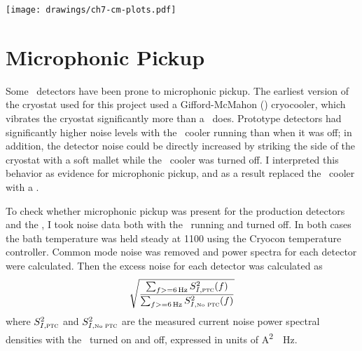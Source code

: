 \begin{figure*}
\texttt{[image: drawings/ch7-cm-plots.pdf]}
\caption[Plots summarizing common mode signal and $1/f$ noise]{
Plots summarizing common mode signal and $1/f$ noise.
\textbf{Upper Left}
Plot showing raw detector output for 15 detectors over a 10-minute data acquisition.
The data was acquired at \SI{15625}{\Hz}, but only every 100th data point is plotted.
\textbf{Upper Right} 
The same data after removal of the common mode signal (as defined in the text).
\textbf{Lower Left} 
Current noise power spectral density for the raw data, the raw data minus the common mode (``No CM''), the raw data minus the common mode and the best-fit 4th-order polynomial (``No CM, Poly''), and the common mode itself (``CM'').
The strong noise peak at \SI{1.411}{\Hz} is due to the \PTC, as explained in the text.
\textbf{Lower Right} 
Raw timestream for , after conversion to an equivalent bath temperature variation, as described in the text.
}
\label{fig:ch7-cm-plots}
\end{figure*}

\section{Microphonic Pickup} \label{sec:ch7-microphonic-pickup}


Some \TES\ detectors have been prone to microphonic pickup.
The earliest version of the cryostat used for this project used a Gifford-McMahon (\GM) cryocooler, which vibrates the cryostat significantly more than a \PTC\ does.
Prototype detectors had significantly higher noise levels with the \GM\ cooler running than when it was off; in addition, the detector noise could be directly increased by striking the side of the cryostat with a soft mallet while the \GM\ cooler was turned off.
I interpreted this behavior as evidence for microphonic pickup, and as a result replaced the \GM\ cooler with a \PTC.

To check whether microphonic pickup was present for the production detectors and the \PTC, I took noise data both with the \PTC\ running and turned off.
In both cases the bath temperature was held steady at \SI{1100}{\mK} using the Cryocon temperature controller.
Common mode noise was removed and power spectra for each detector were calculated.
Then the excess noise for each detector was calculated as
\begin{equation}
  \sqrt{  \frac{ \sum_{f >= \SI{6}{\Hz}} S^2_{I,\textsc{ptc}}(f) }
               { \sum_{f >= \SI{6}{\Hz}} S^2_{I,\mbox{\tiny{No}}\textsc{ ptc}}(f) }}
\end{equation}
where $S^2_{I,\textsc{ptc}}$ and $S^2_{I,\mbox{\tiny{No}}\textsc{ ptc}}$ are the measured current noise power spectral densities with the \PTC\ turned on and off, expressed in units of \si{\A^2 \per \Hz}.

